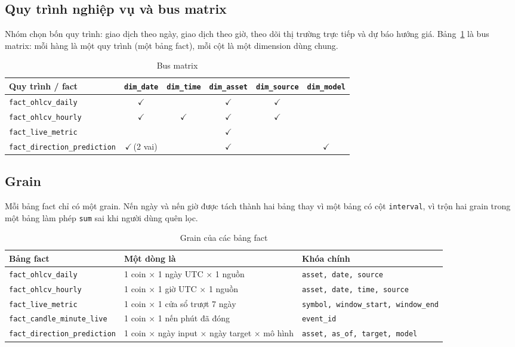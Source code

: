 \documentclass[11pt,a4paper]{article}
\newcommand{\yes}{$\checkmark$}
\newcommand{\code}[1]{\texttt{#1}}
\begin{document}
\subsection{Quy trình nghiệp vụ và bus matrix}
Nhóm chọn bốn quy trình: giao dịch theo ngày, giao dịch theo giờ, theo dõi thị trường trực
tiếp và dự báo hướng giá. Bảng~\ref{tab:bus} là bus matrix: mỗi hàng là một quy trình (một
bảng fact), mỗi cột là một dimension dùng chung.

\begin{table}[H]
\centering\small
\begin{tabular}{lccccc}
\toprule
\textbf{Quy trình / fact} & \code{dim\_date} & \code{dim\_time} & \code{dim\_asset} & \code{dim\_source} & \code{dim\_model} \\
\midrule
\code{fact\_ohlcv\_daily} & \yes & & \yes & \yes & \\
\code{fact\_ohlcv\_hourly} & \yes & \yes & \yes & \yes & \\
\code{fact\_live\_metric} & & & \yes & & \\
\code{fact\_direction\_prediction} & \yes\,(2 vai) & & \yes & & \yes \\
\bottomrule
\end{tabular}
\caption{Bus matrix}\label{tab:bus}
\end{table}

\subsection{Grain}
Mỗi bảng fact chỉ có một grain. Nến ngày và nến giờ được tách thành hai bảng thay vì một
bảng có cột \code{interval}, vì trộn hai grain trong một bảng làm phép \code{sum} sai khi
người dùng quên lọc.

\begin{table}[H]
\centering\small
\begin{tabularx}{\linewidth}{lXl}
\toprule
\textbf{Bảng fact} & \textbf{Một dòng là} & \textbf{Khóa chính} \\
\midrule
\code{fact\_ohlcv\_daily} & 1 coin × 1 ngày UTC × 1 nguồn & \code{asset, date, source} \\
\code{fact\_ohlcv\_hourly} & 1 coin × 1 giờ UTC × 1 nguồn & \code{asset, date, time, source} \\
\code{fact\_live\_metric} & 1 coin × 1 cửa sổ trượt 7 ngày & \code{symbol, window\_start, window\_end} \\
\code{fact\_candle\_minute\_live} & 1 coin × 1 nến phút đã đóng & \code{event\_id} \\
\code{fact\_direction\_prediction} & 1 coin × ngày input × ngày target × mô hình & \code{asset, as\_of, target, model} \\
\bottomrule
\end{tabularx}
\caption{Grain của các bảng fact}
\end{table}
\end{document}
